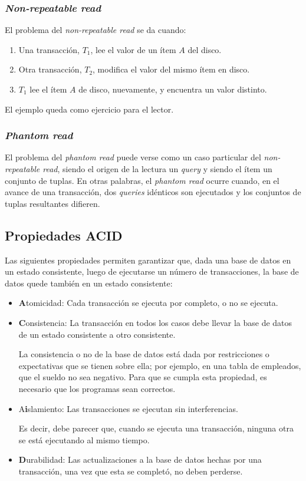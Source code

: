 \documentclass[english,titlepage]{article}
\theoremstyle{definition}
\theoremstyle{definition}
\begin{document}
\subsubsection{\emph{Non-repeatable read}}

El problema del \emph{non-repeatable read} se da cuando:
\begin{enumerate}
    \item Una transacción, $T_1$, lee el valor de un ítem $A$ del disco.
    \item Otra transacción, $T_2$, modifica el valor del mismo ítem en disco.
    \item $T_1$ lee el ítem $A$ de disco, nuevamente, y encuentra un valor
        distinto.
\end{enumerate}

El ejemplo queda como ejercicio para el lector. 

\subsubsection{\emph{Phantom read}}

El problema del \emph{phantom read} puede verse como un caso particular del
\emph{non-repeatable read}, siendo el origen de la lectura un \emph{query} y
siendo el ítem un conjunto de tuplas. En otras palabras, el
\emph{phantom read} ocurre cuando, en el avance de una transacción, dos
\emph{queries} idénticos son ejecutados y los conjuntos de tuplas resultantes
difieren.

\subsection{Propiedades ACID}

Las siguientes propiedades permiten garantizar que, dada una base de datos en
un estado consistente, luego de ejecutarse un número de transacciones, la base
de datos quede también en un estado consistente:

\begin{itemize}
    \item \textbf{A}tomicidad: Cada transacción se ejecuta por completo, o no
        se ejecuta.
    \item \textbf{C}onsistencia: La transacción en todos los casos debe llevar
        la base de datos de un estado consistente a otro consistente.
        
        La consistencia o no de la base de datos está dada por restricciones o
        expectativas que se tienen sobre ella; por ejemplo, en una tabla de
        empleados, que el sueldo no sea negativo. Para que se cumpla esta
        propiedad, es necesario que los programas sean correctos.
    \item A\textbf{i}slamiento: Las transacciones se ejecutan sin
        interferencias.

        Es decir, debe parecer que, cuando se ejecuta una transacción, ninguna
        otra se está ejecutando al mismo tiempo.
    \item \textbf{D}urabilidad: Las actualizaciones a la base de datos hechas
        por una transacción, una vez que esta se completó, no deben perderse.
\end{itemize}
\end{document}
